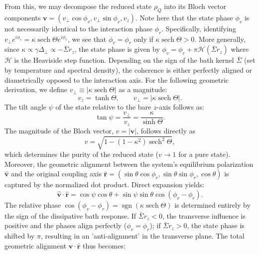 From this, we may decompose the reduced state $\rho_Q$ into its Bloch vector components $\boldsymbol{v} = (v_\perp \cos\phi_v, v_\perp \sin\phi_v, v_z)$. Note here that the state phase $\phi_v$ is not necessarily identical to the interaction phase $\phi_r$. Specifically, identifying $v_\perp e^{i\phi_v} = \kappa \operatorname{sech}\Theta e^{i\phi_r}$, we see that $\phi_v = \phi_r$ only if $\kappa \operatorname{sech}\Theta > 0$. More generally, since $\kappa \propto \gamma \Delta_\perp \propto -\bar{\Sigma}r_z$, the state phase is given by $\phi_v = \phi_r + \pi \mathcal{H}(\bar{\Sigma}r_z)$ where $\mathcal{H}$ is the Heaviside step function. Depending on the sign of the bath kernel $\bar{\Sigma}$ (set by temperature and spectral density), the coherence is either perfectly aligned or diametrically opposed to the interaction axis. For the following geometric derivation, we define $v_\perp \equiv |\kappa \operatorname{sech}\Theta|$ as a magnitude:
\begin{equation}
    v_z = \tanh\Theta, \qquad v_\perp = |\kappa \operatorname{sech}\Theta|.
    \label{eq:bloch_components}
\end{equation}
The tilt angle $\psi$ of the state relative to the bare $z$-axis follows as:
\begin{equation}
    \tan \psi = \frac{v_\perp}{v_z} = \frac{\kappa}{\sinh\Theta}.
    \label{eq:state_tilt}
\end{equation}
The magnitude of the Bloch vector, $v = |\boldsymbol{v}|$, follows directly as
\begin{equation}
    v = \sqrt{1 - (1 - \kappa^2) \operatorname{sech}^2\Theta},
    \label{eq:bloch_magnitude}
\end{equation}
which determines the purity of the reduced state ($v \to 1$ for a pure state). Moreover, the geometric alignment between the system's equilibrium polarization $\hat{\boldsymbol{v}}$ and the original coupling axis $\hat{\boldsymbol{r}} = (\sin\theta\cos\phi_r, \sin\theta\sin\phi_r, \cos\theta)$ is captured by the normalized dot product. Direct expansion yields:
\begin{equation}
    \hat{\boldsymbol{v}} \cdot \hat{\boldsymbol{r}} = \cos\psi\cos\theta + \sin\psi\sin\theta \cos(\phi_v - \phi_r).
    \label{eq:state_alignment}
\end{equation}
The relative phase $\cos(\phi_v - \phi_r) = \operatorname{sgn}(\kappa \operatorname{sech}\Theta)$ is determined entirely by the sign of the dissipative bath response. If $\bar{\Sigma} r_z < 0$, the transverse influence is positive and the phases align perfectly ($\phi_v = \phi_r$); if $\bar{\Sigma} r_z > 0$, the state phase is shifted by $\pi$, resulting in an 'anti-alignment' in the transverse plane. The total geometric alignment $\hat{\boldsymbol{v}} \cdot \hat{\boldsymbol{r}}$ thus becomes:
